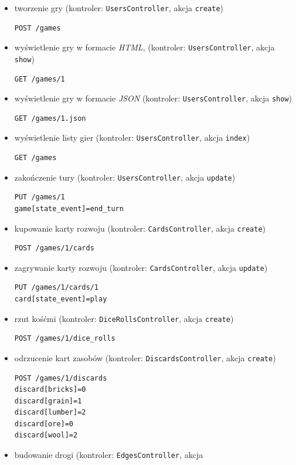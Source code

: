 \documentclass[11pt,twoside]{report}
\begin{document}
\begin{itemize}
\item tworzenie gry (kontroler: \texttt{UsersController}, akcja \texttt{create})
\begin{verbatim}
POST /games
\end{verbatim}
\item wyświetlenie gry w formacie \emph{HTML}, (kontroler:
  \texttt{UsersController}, akcja \texttt{show})
\begin{verbatim}
GET /games/1
\end{verbatim}
\item wyświetlenie gry w formacie \emph{JSON} (kontroler:
  \texttt{UsersController}, akcja \texttt{show})
\begin{verbatim}
GET /games/1.json
\end{verbatim}
\item wyświetlenie listy gier (kontroler: \texttt{UsersController},
  akcja \texttt{index})
\begin{verbatim}
GET /games
\end{verbatim}
\item zakończenie tury (kontroler: \texttt{UsersController}, akcja
  \texttt{update})
\begin{verbatim}
PUT /games/1
game[state_event]=end_turn
\end{verbatim}
\item kupowanie karty rozwoju (kontroler: \texttt{CardsController}, akcja
  \texttt{create})
\begin{verbatim}
POST /games/1/cards
\end{verbatim}
\item zagrywanie karty rozwoju (kontroler: \texttt{CardsController}, akcja
  \texttt{update})
\begin{verbatim}
PUT /games/1/cards/1
card[state_event]=play
\end{verbatim}
\item rzut kośćmi (kontroler: \texttt{DiceRollsController}, akcja
  \texttt{create})
\begin{verbatim}
POST /games/1/dice_rolls
\end{verbatim}
\item odrzucenie kart zasobów (kontroler: \texttt{DiscardsController},
  akcja \texttt{create})
\begin{verbatim}
POST /games/1/discards
discard[bricks]=0
discard[grain]=1
discard[lumber]=2
discard[ore]=0
discard[wool]=2
\end{verbatim}
\item budowanie drogi (kontroler: \texttt{EdgesController}, akcja

\end{itemize}
\end{document}
